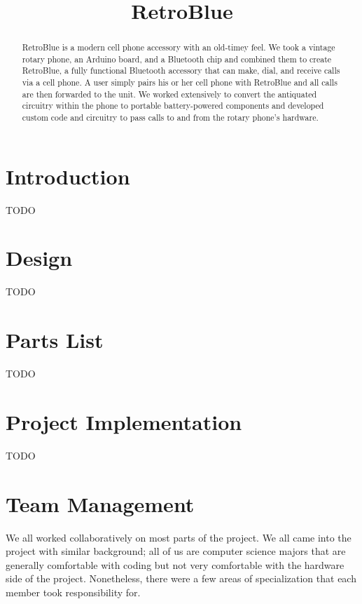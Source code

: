 \documentclass{es50report}
\title{RetroBlue}
\begin{document}
    \maketitlepage

    \begin{abstract}
        RetroBlue is a modern cell phone accessory with an old-timey feel. We took a vintage rotary phone, an Arduino board, and a Bluetooth chip and combined them to create RetroBlue, a fully functional Bluetooth accessory that can make, dial, and receive calls via a cell phone. A user simply pairs his or her cell phone with RetroBlue and all calls are then forwarded to the unit. We worked extensively to convert the antiquated circuitry within the phone to portable battery-powered components and developed custom code and circuitry to pass calls to and from the rotary phone's hardware.
    \end{abstract}
    \newpage
    \doublespacing

    \section{Introduction}
    TODO

    \section{Design}
    TODO

    \section{Parts List}
    TODO

    \section{Project Implementation}
    TODO

    \section{Team Management}
        We all worked collaboratively on most parts of the project. We all came into the project with similar background; all of us are computer science majors that are generally comfortable with coding but not very comfortable with the hardware side of the project. Nonetheless, there were a few areas of specialization that each member took responsibility for.
\end{document}
